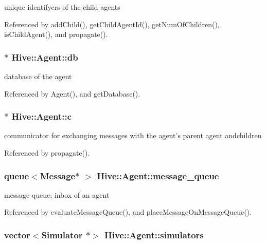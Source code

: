 unique identifyers of the child agents 



Referenced by addChild(), getChildAgentId(), getNumOfChildren(), isChildAgent(), and propagate().
\subsubsection[db]{$\ast$ {\bf Hive::Agent::db}\hspace{0.3cm}{\tt  [protected]}}\label{classHive_1_1Agent_4b74705c85d99d50c455e09f69ba01b3}


database of the agent 



Referenced by Agent(), and getDatabase().
\subsubsection[c]{$\ast$ {\bf Hive::Agent::c}\hspace{0.3cm}{\tt  [protected]}}\label{classHive_1_1Agent_e33ddbcb078d89fd49914966e1c2edff}


communicator for exchanging messages with the agent's parent agent andchildren 



Referenced by propagate().
\subsubsection[message\_\-queue]{\setlength{\rightskip}{0pt plus 5cm}queue$<${\bf Message}$\ast$ $>$ {\bf Hive::Agent::message\_\-queue}\hspace{0.3cm}{\tt  [protected]}}\label{classHive_1_1Agent_e9ad453f7e0d71252685f5b20ab268dd}


message queue; inbox of an agent 



Referenced by evaluateMessageQueue(), and placeMessageOnMessageQueue().
\subsubsection[simulators]{\setlength{\rightskip}{0pt plus 5cm}vector$<${\bf Simulator} $\ast$$>$ {\bf Hive::Agent::simulators}\hspace{0.3cm}{\tt  [protected]}}\label{classHive_1_1Agent_ffc50f2e6b27ea7af8525f9f080e89c9}


